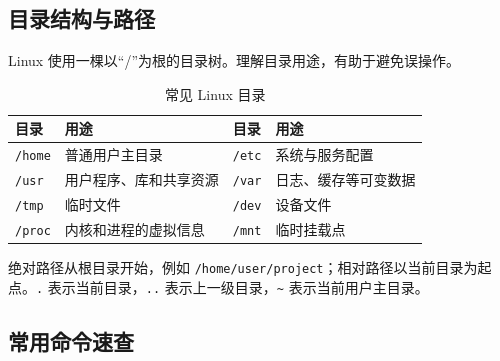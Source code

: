 \documentclass[UTF8,zihao=-4,a4paper,fontset=windows]{ctexart}
\begin{document}
\subsection{目录结构与路径}

Linux 使用一棵以“/”为根的目录树。理解目录用途，有助于避免误操作。

\begin{table}[htbp]
\centering
\caption{常见 Linux 目录}
\begin{tabularx}{\textwidth}{C{2.1cm}Y C{2.1cm}Y}
\toprule
\textbf{目录} & \textbf{用途} & \textbf{目录} & \textbf{用途} \\
\midrule
\texttt{/home} & 普通用户主目录 & \texttt{/etc} & 系统与服务配置 \\
\texttt{/usr} & 用户程序、库和共享资源 & \texttt{/var} & 日志、缓存等可变数据 \\
\texttt{/tmp} & 临时文件 & \texttt{/dev} & 设备文件 \\
\texttt{/proc} & 内核和进程的虚拟信息 & \texttt{/mnt} & 临时挂载点 \\
\bottomrule
\end{tabularx}
\end{table}

绝对路径从根目录开始，例如 \texttt{/home/user/project}；相对路径以当前目录为起点。\texttt{.} 表示当前目录，\texttt{..} 表示上一级目录，\texttt{\textasciitilde} 表示当前用户主目录。

\subsection{常用命令速查}
\end{document}
